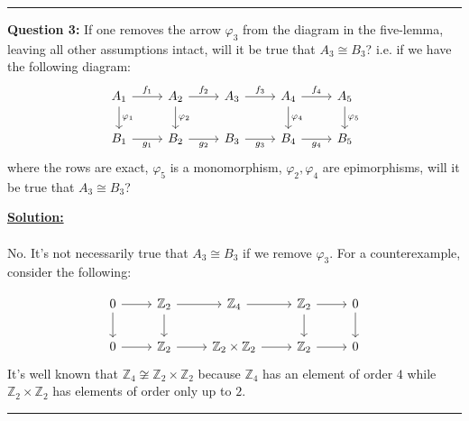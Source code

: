 \documentclass[11pt]{article}
\begin{document}
\vskip 0.5cm
\hrule
\pagebreak





\begin{bluebox}
  \textbf{Question 3:} If one removes the arrow $\varphi_3$ from the diagram in the five-lemma, leaving all other assumptions intact, will it be true that $A_3 \cong B_3$? i.e. if we have the following diagram:
\[\begin{tikzcd}
	{A_1} & {A_2} & {A_3} & {A_4} & {A_5} \\
	{B_1} & {B_2} & {B_3} & {B_4} & {B_5}
	\arrow["{f_1}", from=1-1, to=1-2]
	\arrow["{\varphi_1}", from=1-1, to=2-1]
	\arrow["{f_2}", from=1-2, to=1-3]
	\arrow["{\varphi_2}", from=1-2, to=2-2]
	\arrow["{f_3}", from=1-3, to=1-4]
	\arrow["{f_4}", from=1-4, to=1-5]
	\arrow["{\varphi_4}", from=1-4, to=2-4]
	\arrow["{\varphi_5}", from=1-5, to=2-5]
	\arrow["{g_1}"', from=2-1, to=2-2]
	\arrow["{g_2}"', from=2-2, to=2-3]
	\arrow["{g_3}"', from=2-3, to=2-4]
	\arrow["{g_4}"', from=2-4, to=2-5]
\end{tikzcd}\]
where the rows are exact, $\varphi_5$ is a monomorphism, $\varphi_2, \varphi_4$ are epimorphisms, will it be true that $A_3 \cong B_3$?
\end{bluebox}

\vskip 0.5cm
\textbf{\underline{Solution:}}
\\
\\
No. It's not necessarily true that $A_3 \cong B_3$ if we remove $\varphi_3$. For a counterexample, consider the following:

\[\begin{tikzcd}
	0 & {\mathbb{Z}_2} & {\mathbb{Z}_4} & {\mathbb{Z}_2} & 0 \\
	0 & {\mathbb{Z}_2} & {\mathbb{Z}_2 \times \mathbb{Z}_2} & {\mathbb{Z}_2} & 0
	\arrow[from=1-1, to=1-2]
	\arrow[from=1-1, to=2-1]
	\arrow[from=1-2, to=1-3]
	\arrow[from=1-2, to=2-2]
	\arrow[from=1-3, to=1-4]
	\arrow[from=1-4, to=1-5]
	\arrow[from=1-4, to=2-4]
	\arrow[from=1-5, to=2-5]
	\arrow[from=2-1, to=2-2]
	\arrow[from=2-2, to=2-3]
	\arrow[from=2-3, to=2-4]
	\arrow[from=2-4, to=2-5]
\end{tikzcd}\] It's well known that $\mathbb{Z}_4 \not\cong \mathbb{Z}_2 \times \mathbb{Z}_2 $ because $\mathbb{Z}_4$ has an element of order $4$ while $\mathbb{Z}_2 \times \mathbb{Z}_2$ has elements of order only up to $2$.


\vskip 0.5cm
\hrule
\pagebreak
\end{document}

